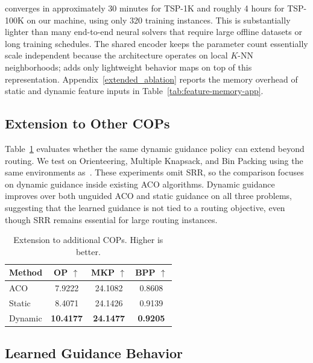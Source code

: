 \DyNACS{} converges in approximately 30 minutes for TSP-1K and roughly 4 hours for TSP-100K on our machine, using only 320 training instances. This is substantially lighter than many end-to-end neural solvers that require large offline datasets or long training schedules. The shared \DyNACO{} encoder keeps the parameter count essentially scale independent because the architecture operates on local $K$-NN neighborhoods; \DyNACS{} adds only lightweight behavior maps on top of this representation. Appendix~\ref{extended_ablation} reports the memory overhead of static and dynamic feature inputs in Table~\ref{tab:feature-memory-app}.

\subsection{Extension to Other COPs}
\label{sec:other-cops}

Table~\ref{tab:other-cops} evaluates whether the same dynamic guidance policy can extend beyond routing. We test on Orienteering, Multiple Knapsack, and Bin Packing using the same environments as~\cite{deepaco}. These experiments omit SRR, so the comparison focuses on dynamic guidance inside existing ACO algorithms. Dynamic guidance improves over both unguided ACO and static guidance on all three problems, suggesting that the learned guidance is not tied to a routing objective, even though SRR remains essential for large routing instances.

\begin{table}[h]
\centering
\caption{Extension to additional COPs. Higher is better.}
\label{tab:other-cops}
\small
\renewcommand{\arraystretch}{0.85}
\begin{tabular*}{\columnwidth}{@{\extracolsep{\fill}}lccc@{}}
\toprule
Method & OP $\uparrow$ & MKP $\uparrow$ & BPP $\uparrow$ \\
\midrule
ACO & 7.9222 & 24.1082 & 0.8608 \\
Static & 8.4071 & 24.1426 & 0.9139 \\
Dynamic & \textbf{10.4177} & \textbf{24.1477} & \textbf{0.9205} \\
\bottomrule
\end{tabular*}
\end{table}

\subsection{Learned Guidance Behavior}
\label{sec:guidance-behavior}

